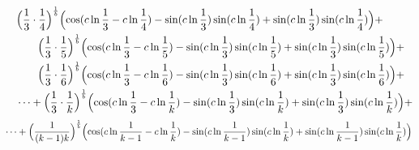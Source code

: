 \documentclass{amsart}
\begin{document}
	\[
	\begin{aligned}
		\quad & \Bigl( \frac{1}{3} \cdot \frac{1}{4} \Bigr)^\frac1b \Bigl( \cos(c \ln \frac{1}{3} - c \ln \frac{1}{4}) - \sin(c \ln \frac{1}{3}) \sin(c \ln \frac{1}{4}) + \sin(c \ln \frac{1}{3}) \sin(c \ln \frac{1}{4}) \Bigr) + \\
		& \qquad \Bigl( \frac{1}{3} \cdot \frac{1}{5} \Bigr)^\frac1b \Bigl( \cos(c \ln \frac{1}{3} - c \ln \frac{1}{5}) - \sin(c \ln \frac{1}{3}) \sin(c \ln \frac{1}{5}) + \sin(c \ln \frac{1}{3}) \sin(c \ln \frac{1}{5}) \Bigr) + \\
		& \qquad \Bigl( \frac{1}{3} \cdot \frac{1}{6} \Bigr)^\frac1b \Bigl( \cos(c \ln \frac{1}{3} - c \ln \frac{1}{6}) - \sin(c \ln \frac{1}{3}) \sin(c \ln \frac{1}{6}) + \sin(c \ln \frac{1}{3}) \sin(c \ln \frac{1}{6}) \Bigr) + \\
		& \dots  + \Bigl( \frac{1}{3} \cdot \frac{1}{k} \Bigr)^\frac1b \Bigl( \cos(c \ln \frac{1}{3} - c \ln \frac{1}{k}) - \sin(c \ln \frac{1}{3}) \sin(c \ln \frac{1}{k}) + \sin(c \ln \frac{1}{3}) \sin(c \ln \frac{1}{k}) \Bigr) + 
	\end{aligned}
	\]
	\[ \dots + \Bigl( \frac{1}{(k-1)k} \Bigr)^\frac1b \Bigl( \cos(c \ln \frac{1}{k-1} - c \ln \frac{1}{k}) - \sin(c \ln \frac{1}{k-1}) \sin(c \ln \frac{1}{k}) + \sin(c \ln \frac{1}{k-1}) \sin(c \ln \frac{1}{k}) \Bigr) \]
	
\end{document}

